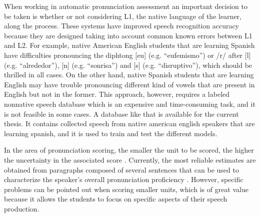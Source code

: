 When working in automatic pronunciation assessment an important decision to be taken is
whether or not considering L1, the native language of the learner, along the process. These
systems have improved speech recognition accuracy because they are designed
taking into account common known errors between L1 and L2. For example, native American English
students that are learning Spanish have difficulties pronouncing the diphtong [eu]
(e.g. ``eufemismo'') or
/r/ after [l] (e.g. ``alrededor''), [n] (e.g. ``sonrisa'') and [s] (e.g. ``disruptivo''),
which should be thrilled in all cases.
On the other hand, native Spanish students
that are learning English may have trouble pronouncing
different kind of vowels that are present in English
but not in the former. This approach, however, requires a labeled nonnative speech database
which is an expensive and time-consuming task, and
it is not feasible in some cases.
A database like that
is available
for the current thesis.
It contains collected
speech from native american english speakers that are learning
spanish, and it is used to train and test the different models.




In the area of pronunciation scoring, the smaller the unit to be scored, the higher the
uncertainty in the associated score \cite{pronunciation_scoring_phone_segments_instruction}.
Currently, the most reliable estimates are obtained from paragraphs composed of several
sentences that can be used to characterize the speaker's overall pronunciation
proficiency \cite{main}. However, specific problems can be pointed out
when scoring smaller units, which is of great value because it allows the students to focus
on specific aspects of their speech production.


